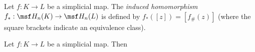 \begin{definition}
  Let $f : K \to L$ be a simplicial map. The \emph{induced homomorphism} $f_* :
  \msf H_n(K) \to \msf H_n(L)$ is defined by $f_*([z]) = [f_\#(z)]$ (where the
  square brackets indicate an equivalence class).
\end{definition}
\begin{problem}[16.17]
  Let $f : K \to L$ be a simplicial map. Then
\end{problem}

